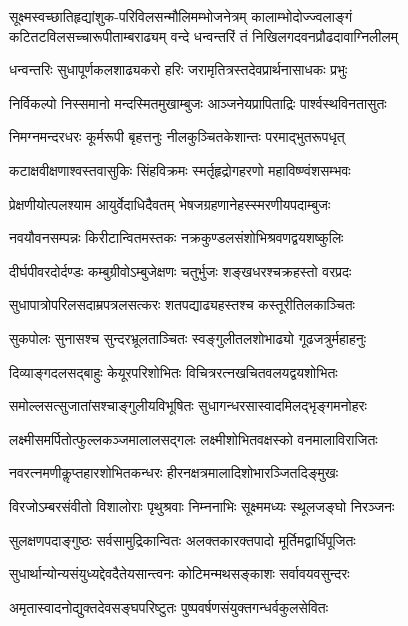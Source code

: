 

{सूक्ष्मस्वच्छातिहृद्यांशुक-परिविलसन्मौलिमम्भोजनेत्रम्}
{कालाम्भोदोज्ज्वलाङ्गं कटितटविलसच्चारूपीताम्बराढ्यम्}
{वन्दे धन्वन्तरिं तं निखिलगदवनप्रौढदावाग्निलीलम्}

\twolineshloka
{धन्वन्तरिः सुधापूर्णकलशाढ्यकरो हरिः}
{जरामृतित्रस्तदेवप्रार्थनासाधकः प्रभुः}

\twolineshloka
{निर्विकल्पो निस्समानो मन्दस्मितमुखाम्बुजः}
{आञ्जनेयप्रापिताद्रिः पार्श्वस्थविनतासुतः}

\twolineshloka
{निमग्नमन्दरधरः कूर्मरूपी बृहत्तनुः}
{नीलकुञ्चितकेशान्तः परमाद्भुतरूपधृत्}

\twolineshloka
{कटाक्षवीक्षणाश्वस्तवासुकिः सिंहविक्रमः}
{स्मर्तृहृद्रोगहरणो महाविष्ण्वंशसम्भवः}

\twolineshloka
{प्रेक्षणीयोत्पलश्याम आयुर्वेदाधिदैवतम्}
{भेषजग्रहणानेहस्स्मरणीयपदाम्बुजः}

\twolineshloka
{नवयौवनसम्पन्नः किरीटान्वितमस्तकः}
{नक्रकुण्डलसंशोभिश्रवणद्वयशष्कुलिः}

\twolineshloka
{दीर्घपीवरदोर्दण्डः कम्बुग्रीवोऽम्बुजेक्षणः}
{चतुर्भुजः शङ्खधरश्चक्रहस्तो वरप्रदः}

\twolineshloka
{सुधापात्रोपरिलसदाम्रपत्रलसत्करः}
{शतपद्याढ्यहस्तश्च कस्तूरीतिलकाञ्चितः}

\twolineshloka
{सुकपोलः सुनासश्च सुन्दरभ्रूलताञ्चितः}
{स्वङ्गुलीतलशोभाढ्यो गूढजत्रुर्महाहनुः}

\twolineshloka
{दिव्याङ्गदलसद्बाहुः केयूरपरिशोभितः}
{विचित्ररत्नखचितवलयद्वयशोभितः}

\twolineshloka
{समोल्लसत्सुजातांसश्चाङ्गुलीयविभूषितः}
{सुधागन्धरसास्वादमिलद्भृङ्गमनोहरः}

\twolineshloka
{लक्ष्मीसमर्पितोत्फुल्लकञ्जमालालसद्गलः}
{लक्ष्मीशोभितवक्षस्को वनमालाविराजितः}

\twolineshloka
{नवरत्नमणीकॢप्तहारशोभितकन्धरः}
{हीरनक्षत्रमालादिशोभारञ्जितदिङ्मुखः}

\twolineshloka
{विरजोऽम्बरसंवीतो विशालोराः पृथुश्रवाः}
{निम्ननाभिः सूक्ष्ममध्यः स्थूलजङ्घो निरञ्जनः}

\twolineshloka
{सुलक्षणपदाङ्गुष्ठः सर्वसामुद्रिकान्वितः}
{अलक्तकारक्तपादो मूर्तिमद्वार्धिपूजितः}

\twolineshloka
{सुधार्थान्योन्यसंयुध्यद्देवदैतेयसान्त्वनः}
{कोटिमन्मथसङ्काशः सर्वावयवसुन्दरः}

\twolineshloka
{अमृतास्वादनोद्युक्तदेवसङ्घपरिष्टुतः}
{पुष्पवर्षणसंयुक्तगन्धर्वकुलसेवितः}

